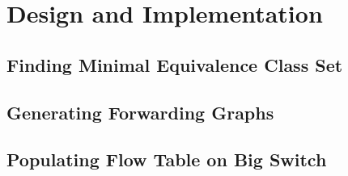 \section{Design and Implementation}

\subsection{Finding Minimal Equivalence Class Set}

\subsection{Generating Forwarding Graphs}

\subsection{Populating Flow Table on Big Switch}


